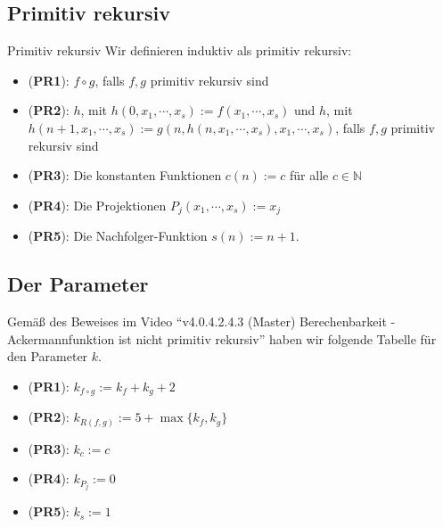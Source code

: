 \documentclass[a4paper]{amsart}
\theoremstyle{definition}
\newcommand{\N}{\ensuremath{\mathbb{ N }}}
\begin{document}
\subsection{Primitiv rekursiv}

\begin{Definition}{Primitiv rekursiv}
    Wir definieren induktiv als primitiv rekursiv:
	\begin{itemize}
		\item (\textbf{PR1}): $f \circ g$, falls $f,g$ primitiv rekursiv sind
		\item (\textbf{PR2}): $h$, mit $h( 0, x_1, \cdots, x_s ) := f( x_1, \cdots, x_s )$ und
			$h$, mit $h( n+1, x_1, \cdots, x_s ) := g(n, h( n, x_1, \cdots, x_s ), x_1, \cdots, x_s)$,
		falls $f,g$ primitiv rekursiv sind 
		\item (\textbf{PR3}): Die konstanten Funktionen $c(n) := c$ für alle $c \in \N$ 
		\item (\textbf{PR4}): Die Projektionen $P_j(x_1, \cdots, x_s ) := x_j$
		\item (\textbf{PR5}): Die Nachfolger-Funktion $s(n) := n+1$.
	\end{itemize}
\end{Definition}

\subsection{Der Parameter}
Gemäß des Beweises im Video "`v4.0.4.2.4.3 (Master) Berechenbarkeit - Ackermannfunktion ist nicht primitiv rekursiv"' haben wir folgende Tabelle für den Parameter $k$.

\begin{itemize}
	\item (\textbf{PR1}): $k_{f \circ g} := k_f + k_g + 2$
	\item (\textbf{PR2}): $k_{R(f,g)} := 5 + \max \{ k_f, k_g \}$ 
	\item (\textbf{PR3}): $k_c := c$
	\item (\textbf{PR4}): $k_{P_j} := 0$
	\item (\textbf{PR5}): $k_s := 1$
\end{itemize}
\end{document}
